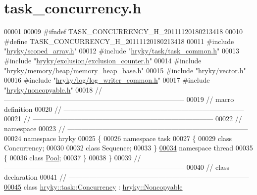 \hypertarget{task__concurrency_8h_source}{\section{task\-\_\-concurrency.\-h}
}

\begin{DoxyCode}
00001 
00009 \textcolor{preprocessor}{#ifndef TASK\_CONCURRENCY\_H\_20111120180213418}
00010 \textcolor{preprocessor}{}\textcolor{preprocessor}{#define TASK\_CONCURRENCY\_H\_20111120180213418}
00011 \textcolor{preprocessor}{}\textcolor{preprocessor}{#include "\hyperlink{scoped__array_8h}{hryky/scoped_array.h}"}
00012 \textcolor{preprocessor}{#include "\hyperlink{task__common_8h}{hryky/task/task_common.h}"}
00013 \textcolor{preprocessor}{#include "\hyperlink{exclusion__counter_8h}{hryky/exclusion/exclusion_counter.h}"}
00014 \textcolor{preprocessor}{#include "\hyperlink{memory__heap__base_8h}{hryky/memory/heap/memory_heap_base.h}"}
00015 \textcolor{preprocessor}{#include "\hyperlink{vector_8h}{hryky/vector.h}"}
00016 \textcolor{preprocessor}{#include "\hyperlink{log__writer__common_8h}{hryky/log/log_writer_common.h}"}
00017 \textcolor{preprocessor}{#include "\hyperlink{noncopyable_8h}{hryky/noncopyable.h}"}
00018 \textcolor{comment}{//
      ------------------------------------------------------------------------------}
00019 \textcolor{comment}{// macro definition}
00020 \textcolor{comment}{//
      ------------------------------------------------------------------------------}
00021 \textcolor{comment}{//
      ------------------------------------------------------------------------------}
00022 \textcolor{comment}{// namespace}
00023 \textcolor{comment}{//
      ------------------------------------------------------------------------------}
00024 \textcolor{keyword}{namespace }hryky
00025 \{
00026 \textcolor{keyword}{namespace }task
00027 \{
00029     \textcolor{keyword}{class }Concurrency;
00030 
00032     \textcolor{keyword}{class }Sequence;
00033 \}
\hypertarget{task__concurrency_8h_source_l00034}{}\hyperlink{namespacehryky_1_1thread}{00034} \textcolor{keyword}{namespace }thread
00035 \{
00036     \textcolor{keyword}{class }\hyperlink{classhryky_1_1thread_1_1_pool}{Pool};
00037 \}
00038 \}
00039 \textcolor{comment}{//
      ------------------------------------------------------------------------------}
00040 \textcolor{comment}{// class declaration}
00041 \textcolor{comment}{//
      ------------------------------------------------------------------------------}
\hypertarget{task__concurrency_8h_source_l00045}{}\hyperlink{classhryky_1_1task_1_1_concurrency}{00045} \textcolor{comment}{}\textcolor{keyword}{class }\hyperlink{classhryky_1_1task_1_1_concurrency}{hryky::task::Concurrency} : \hyperlink{classhryky_1_1_noncopyable}{hryky::Noncopyable}

\end{DoxyCode}
